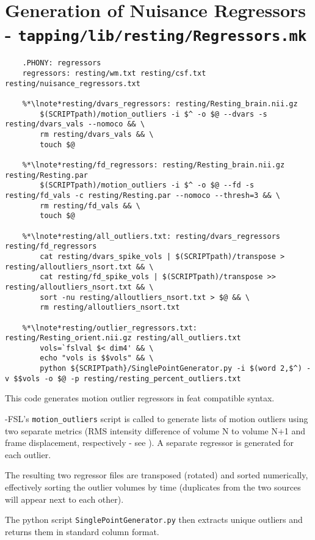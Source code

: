 \section{Generation of Nuisance Regressors - \texttt{tapping/lib/resting/Regressors.mk}}
\begin{lstlisting}
	.PHONY: regressors
	regressors: resting/wm.txt resting/csf.txt resting/nuisance_regressors.txt
	
	%*\lnote*resting/dvars_regressors: resting/Resting_brain.nii.gz
		$(SCRIPTpath)/motion_outliers -i $^ -o $@ --dvars -s resting/dvars_vals --nomoco && \
		rm resting/dvars_vals && \
		touch $@
	
	%*\lnote*resting/fd_regressors: resting/Resting_brain.nii.gz resting/Resting.par
		$(SCRIPTpath)/motion_outliers -i $^ -o $@ --fd -s resting/fd_vals -c resting/Resting.par --nomoco --thresh=3 && \
		rm resting/fd_vals && \
		touch $@
	
	%*\lnote*resting/all_outliers.txt: resting/dvars_regressors resting/fd_regressors
		cat resting/dvars_spike_vols | $(SCRIPTpath)/transpose > resting/alloutliers_nsort.txt && \
		cat resting/fd_spike_vols | $(SCRIPTpath)/transpose >> resting/alloutliers_nsort.txt && \
		sort -nu resting/alloutliers_nsort.txt > $@ && \
		rm resting/alloutliers_nsort.txt
	
	%*\lnote*resting/outlier_regressors.txt: resting/Resting_orient.nii.gz resting/all_outliers.txt
		vols=`fslval $< dim4' && \
		echo "vols is $$vols" && \
		python ${SCRIPTpath}/SinglePointGenerator.py -i $(word 2,$^) -v $$vols -o $@ -p resting/resting_percent_outliers.txt
\end{lstlisting}

This code generates motion outlier regressors in feat compatible syntax.

-FSL's \texttt{motion_outliers} script is called to generate lists of motion outliers using two separate metrics (RMS intensity difference of volume N to volume N+1 and frame displacement, respectively - see \citep{powerspurious2012}). A separate regressor is generated for each outlier.

\lnum{29}The resulting two regressor files are transposed (rotated) and sorted numerically, effectively sorting the outlier volumes by time (duplicates from the two sources will appear next to each other).

\lnum{30}The python script \texttt{SinglePointGenerator.py} then extracts unique outliers and returns them in standard column format.

